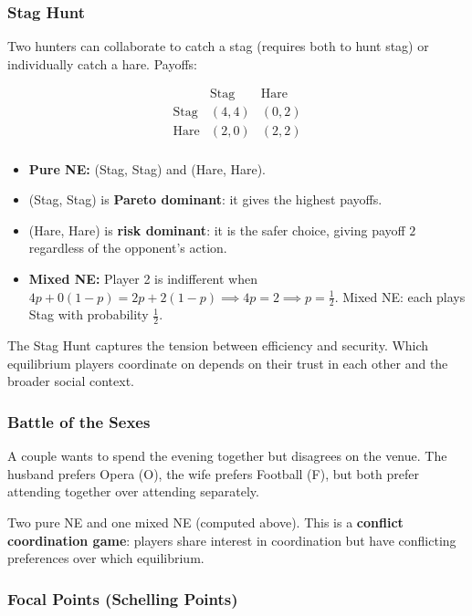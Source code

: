 \documentclass[hidelinks]{article}
\begin{document}
\subsubsection{Stag Hunt}

Two hunters can collaborate to catch a stag (requires both to hunt stag) or individually catch a hare. Payoffs:

\[
\begin{array}{c|cc}
 & \text{Stag} & \text{Hare} \\
\hline
\text{Stag} & (4,4) & (0,2) \\
\text{Hare} & (2,0) & (2,2) \\
\end{array}
\]

\begin{itemize}
    \item \textbf{Pure NE:} (Stag, Stag) and (Hare, Hare).
    \item (Stag, Stag) is \textbf{Pareto dominant}: it gives the highest payoffs.
    \item (Hare, Hare) is \textbf{risk dominant}: it is the safer choice, giving payoff $2$ regardless of the opponent's action.
    \item \textbf{Mixed NE:} Player 2 is indifferent when $4p + 0(1-p) = 2p + 2(1-p) \implies 4p = 2 \implies p = \frac{1}{2}$. Mixed NE: each plays Stag with probability $\frac{1}{2}$.
\end{itemize}

The Stag Hunt captures the tension between efficiency and security. Which equilibrium players coordinate on depends on their trust in each other and the broader social context.

\subsubsection{Battle of the Sexes}

A couple wants to spend the evening together but disagrees on the venue. The husband prefers Opera (O), the wife prefers Football (F), but both prefer attending together over attending separately.

Two pure NE and one mixed NE (computed above). This is a \textbf{conflict coordination game}: players share interest in coordination but have conflicting preferences over which equilibrium.

\subsubsection{Focal Points (Schelling Points)}
\end{document}
